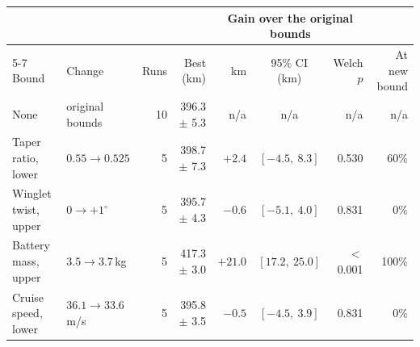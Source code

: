 \begin{tabular*}{\linewidth}{@{\extracolsep{\fill}}llrrrcrr@{}}
\toprule
 & & & & \multicolumn{3}{c}{Gain over the original bounds} & \\
\cmidrule(lr){5-7}
Bound & Change & Runs & Best (km) & km & 95\% CI (km) & Welch $p$ & At new bound \\
\midrule
None & original bounds & 10 & 396.3 $\pm$ 5.3 & n/a & n/a & n/a & n/a \\
Taper ratio, lower & $0.55 \to 0.525$ & 5 & 398.7 $\pm$ 7.3 & $+2.4$ & $[-4.5,\ 8.3]$ & 0.530 & 60\% \\
Winglet twist, upper & $0 \to +1^\circ$ & 5 & 395.7 $\pm$ 4.3 & $-0.6$ & $[-5.1,\ 4.0]$ & 0.831 & 0\% \\
Battery mass, upper & $3.5 \to 3.7$\,kg & 5 & 417.3 $\pm$ 3.0 & $+21.0$ & $[17.2,\ 25.0]$ & $<$0.001 & 100\% \\
Cruise speed, lower & $36.1 \to 33.6$\,m/s & 5 & 395.8 $\pm$ 3.5 & $-0.5$ & $[-4.5,\ 3.9]$ & 0.831 & 0\% \\
\bottomrule
\end{tabular*}

